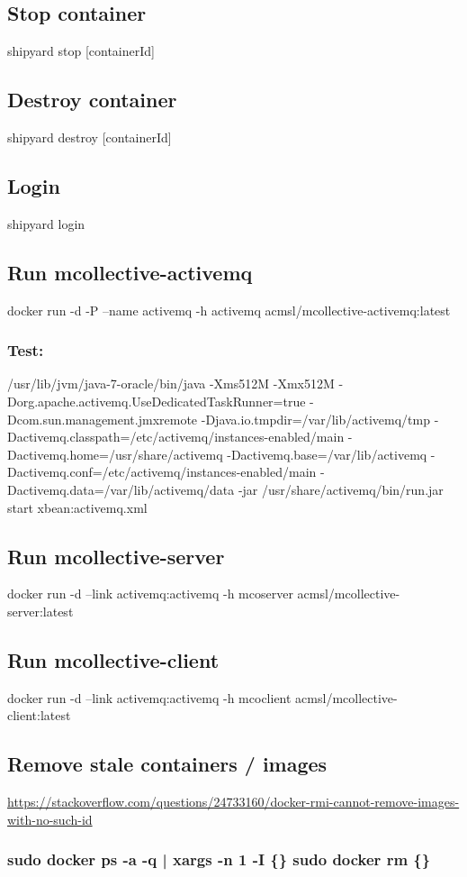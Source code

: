 \documentclass[11pt]{article}
\begin{document}
\subsection{Stop container}
\label{sec-3-3}
shipyard stop [containerId]
\subsection{Destroy container}
\label{sec-3-4}
shipyard destroy [containerId]
\subsection{Login}
\label{sec-3-5}
shipyard login
\subsection{Run mcollective-activemq}
\label{sec-3-6}
docker run -d -P --name activemq -h activemq acmsl/mcollective-activemq:latest
\subsubsection{Test:}
\label{sec-3-6-1}
/usr/lib/jvm/java-7-oracle/bin/java -Xms512M -Xmx512M -Dorg.apache.activemq.UseDedicatedTaskRunner=true -Dcom.sun.management.jmxremote -Djava.io.tmpdir=/var/lib/activemq/tmp -Dactivemq.classpath=/etc/activemq/instances-enabled/main -Dactivemq.home=/usr/share/activemq -Dactivemq.base=/var/lib/activemq -Dactivemq.conf=/etc/activemq/instances-enabled/main -Dactivemq.data=/var/lib/activemq/data -jar /usr/share/activemq/bin/run.jar start xbean:activemq.xml
\subsection{Run mcollective-server}
\label{sec-3-7}
docker run -d --link activemq:activemq -h mcoserver acmsl/mcollective-server:latest
\subsection{Run mcollective-client}
\label{sec-3-8}
docker run -d --link activemq:activemq -h mcoclient acmsl/mcollective-client:latest
\subsection{Remove stale containers / images}
\label{sec-3-9}
\url{https://stackoverflow.com/questions/24733160/docker-rmi-cannot-remove-images-with-no-such-id}
\subsubsection{sudo docker ps -a -q | xargs -n 1 -I \{\} sudo docker rm \{\}}
\label{sec-3-9-1}
\end{document}
